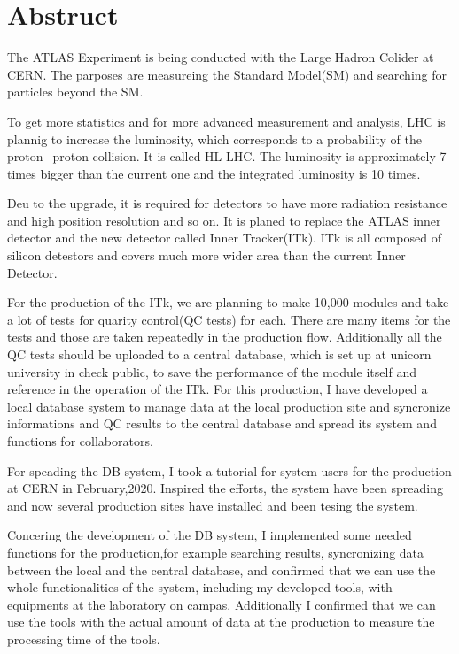 \chapter*{Abstruct}

The ATLAS Experiment is being conducted with the Large Hadron Colider at CERN. The parposes are measureing the Standard Model(SM) and searching for particles beyond the SM.

To get more statistics and for more advanced measurement and analysis, LHC is plannig to increase the luminosity, which corresponds to a probability of the proton$-$proton collision. It is called HL-LHC.
The luminosity is approximately 7 times bigger than the current one and the integrated luminosity is 10 times.

Deu to the upgrade, it is required for detectors to have more radiation resistance and high position resolution and so on. 
It is planed to replace the ATLAS inner detector and the new detector called Inner Tracker(ITk). 
ITk is all composed of silicon detestors and covers much more wider area than the current Inner Detector.

For the production of the ITk, we are planning to make 10,000 modules and take a lot of tests for quarity control(QC tests) for each. 
There are many items for the tests and those are taken repeatedly in the production flow.
Additionally all the QC tests should be uploaded to a central database, which is set up at unicorn university in check public, to save the performance of the module itself and reference in the operation of the ITk. 
For this production, I have developed a local database system to manage data at the local production site and syncronize informations and QC results to the central database and spread its system and functions for collaborators.

For speading the DB system, I took a tutorial for system users for the production at CERN in February,2020. Inspired the efforts, the system have been spreading and now several production sites have installed and been tesing the system.

Concering the development of the DB system, I implemented some needed functions for the production,for example searching results, syncronizing data between the local and the central database, and confirmed that we can use the whole functionalities of the system, including my developed tools, with equipments at the laboratory on campas. 
Additionally I confirmed that we can use the tools with the actual amount of data at the production to measure the processing time of the tools.

